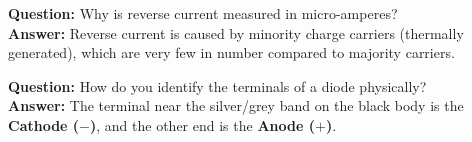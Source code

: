 \begin{vivaqa}
\textbf{Question:} Why is reverse current measured in micro-amperes?\\[4pt]
\textbf{Answer:} Reverse current is caused by minority charge carriers (thermally generated), which are very few in number compared to majority carriers.
\end{vivaqa}

\begin{vivaqa}
\textbf{Question:} How do you identify the terminals of a diode physically?\\[4pt]
\textbf{Answer:} The terminal near the silver/grey band on the black body is the \textbf{Cathode ($-$)}, and the other end is the \textbf{Anode ($+$)}.
\end{vivaqa}
